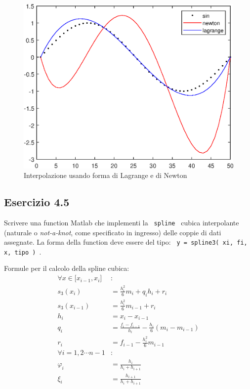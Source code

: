 \begin{figure}\label{sin_interpolation}
    \centering
    \includegraphics{./capitolo_4/sin_interpolation}
    \caption{Interpolazione usando forma di Lagrange e di Newton}
\end{figure} 



	\subsection {Esercizio 4.5}
Scrivere una function Matlab che implementi la \texttt { spline } cubica interpolante (naturale o \textit{not-a-knot}, come specificato in ingresso) delle coppie di dati assegnate. La forma della function deve essere del tipo: \texttt { y = spline3( xi, fi, x, tipo ) }.

Formule per il calcolo della spline cubica:
\begin{equation*}
	\begin{split}
		\forall x \in \lbrack x_{i-1}, x_i \rbrack & : \\
		s_3(x_i) & = \frac{h_i^2}{6}m_i + q_i h_i +r_i \\
		s_3(x_{i-1}) & = \frac{h_i^2}{6}m_{i-1} + r_i \\
		h_i & = x_i - x_{i-1} \\
		q_i & = \frac{f_i - f_{i-1}}{h_i} - \frac{h_i}{6}(m_i -m_{i-1})\\ 
		r_i &= f_{i-1}  - \frac{h_i^2}{6}m_{i-1} \\
		\forall i = 1, 2 \cdots n-1 & : \\
		\varphi_i & = \frac{h_i}{h_i+h_{i+1}} \\
		\xi_i & = \frac{h_{i+1}}{h_i+h_{i+1}} 
	\end{split}
\end{equation*}

